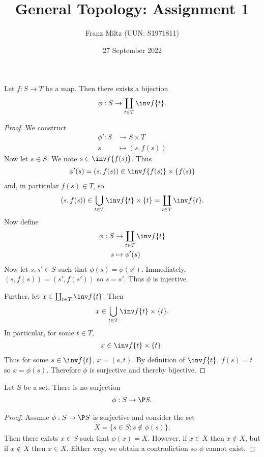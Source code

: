 \documentclass{article}
\begin{document}
\title{General Topology: Assignment 1}
\author{Franz Miltz (UUN: S1971811)}
\date{27 September 2022}
\maketitle

\begin{claim*}[1]
	Let $f:S\to T$ be a map. Then there exists a bijection
	\begin{align*}
		\phi : S \to \coprod_{t\in T} \inv f \{t\}.
	\end{align*}
	\begin{proof}
		We construct
		\begin{align*}
			\phi' : S & \to S \times T    \\
			s         & \mapsto (s, f(s))
		\end{align*}
		Now let $s\in S$. We note $s\in \inv f\{f(s)\}$. Thus
		\begin{align*}
			\phi'(s)=(s,f(s))\in \inv f\{f(s)\}\times \{f(s)\}
		\end{align*}
		and, in particular $f(s)\in T$, so
		\begin{align*}
			(s,f(s))\in \bigcup_{t\in T} \inv f \{t\}\times \{t\} = \coprod_{t\in T} \inv f \{t\}.
		\end{align*}
		Now define
		\begin{align*}
			\phi : S & \to \coprod_{t\in T} \inv f \{t\} \\
			s        & \mapsto \phi'(s)
		\end{align*}
		Now let $s,s'\in S$ such that $\phi(s)=\phi(s')$. Immediately,
		$(s,f(s))=(s',f(s'))$ so $s=s'$. Thus $\phi$ is injective.

		Further, let $x\in \coprod_{t\in T} \inv f\{t\}$. Then
		\begin{align*}
			x \in \bigcup_{t\in T} \inv f \{t\} \times \{t\}.
		\end{align*}
		In particular, for some $t\in T$,
		\begin{align*}
			x\in \inv f\{t\} \times \{t\}.
		\end{align*}
		Thus for some $s\in \inv f\{t\}$, $x=(s,t)$. By definition of $\inv f\{t\}$,
		$f(s)=t$ so $x=\phi(s)$. Therefore $\phi$ is surjective and thereby bijective.
	\end{proof}
\end{claim*}

\begin{claim*}[2]
	Let $S$ be a set. There is no surjection
	\begin{align*}
		\phi : S \to \P S.
	\end{align*}
	\begin{proof}
		Assume $\phi:S\to \P S$ is surjective and consider the set
		\begin{align*}
			X = \{ s\in S : s \not\in \phi(s)\}.
		\end{align*}
		Then there exists $x\in S$ such that $\phi(x) = X$. However, if $x\in X$ then
		$x\not\in X$, but if $x\not\in X$ then $x\in X$. Either way, we obtain a contradiction
		so $\phi$ cannot exist.
	\end{proof}
\end{claim*}
\end{document}
